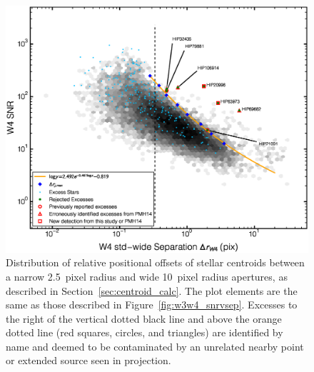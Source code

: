 \begin{figure}
\centering
\includegraphics[scale=0.5]{Ch4/w4w4_snrvsep}
\caption{Distribution of relative positional offsets of stellar centroids between a narrow 2.5~pixel radius and wide 10~pixel radius apertures, as described in Section~\ref{sec:centroid_calc}. The plot elements are the same as those described in Figure~\ref{fig:w3w4_snrvsep}. Excesses to the right of the vertical dotted black line and above the orange dotted line (red squares, circles, and triangles) are identified by name and deemed to be contaminated by an unrelated nearby point or extended source seen in projection.}
\label{fig:w4w4_snrvsep}
\end{figure}

